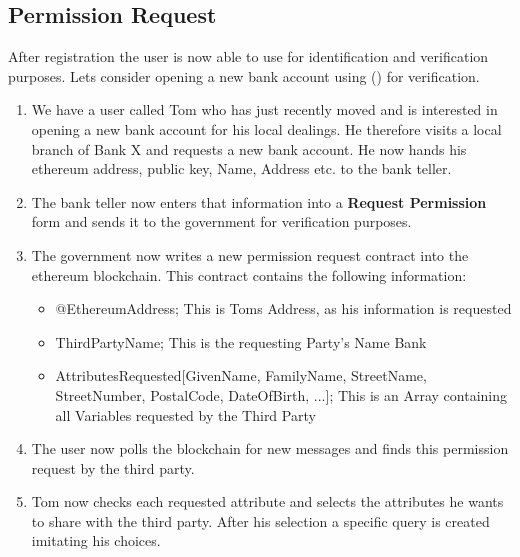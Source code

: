 \subsection{Permission Request}
After registration the user is now able to use \projectName{} for identification and verification purposes. Lets consider opening a new bank account using \projectName() for verification.


\begin{enumerate}
\item \label{permission_request_item_one}
We have a user called Tom who has just recently moved and is interested in opening a new bank account for his local dealings. He therefore visits a local branch of Bank X and requests a new bank account. He now hands his ethereum address, public key, Name, Address etc. to the bank teller.
\item \label{permission_request_item_two}
The bank teller now enters that information into a \textbf{Request Permission} form and sends it to the government for verification purposes.
\item \label{permission_request_item_three}
The government now writes a new permission request contract into the ethereum blockchain. This contract contains the following information:
\begin{itemize}
\item @EthereumAddress; This is Toms Address, as his information is requested
\item ThirdPartyName; This is the requesting Party's Name Bank 
\item AttributesRequested[GivenName, FamilyName, StreetName, StreetNumber, PostalCode, DateOfBirth, ...]; This is an Array containing all Variables requested by the Third Party
\end{itemize}
\item \label{permission_request_item_four}
The user now polls the blockchain for new messages and finds this permission request by the third party.
\item \label{permission_request_item_five}
Tom now checks each requested attribute and selects the attributes he wants to share with the third party. After his selection a specific query is created imitating his choices.
\end{enumerate}

